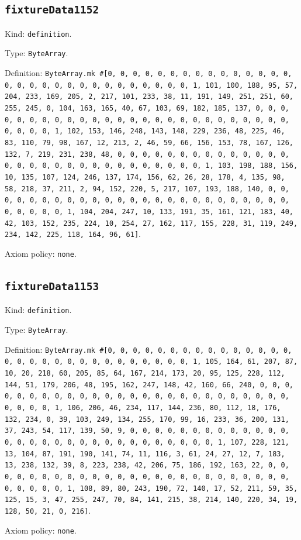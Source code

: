 \documentclass[11pt]{article}
\begin{document}
\subsection*{\texttt{fixtureData1152}}
\noindent Kind: \texttt{definition}.\par
\noindent Type: \texttt{ByteArray}.\par
\noindent Definition: \texttt{ByteArray.mk \#[0, 0, 0, 0, 0, 0, 0, 0, 0, 0, 0, 0, 0, 0, 0, 0, 0, 0, 0, 0, 0, 0, 0, 0, 0, 0, 0, 0, 0, 0, 1, 101, 100, 188, 95, 57, 204, 233, 169, 205, 2, 217, 101, 233, 38, 11, 191, 149, 251, 251, 60, 255, 245, 0, 104, 163, 165, 40, 67, 103, 69, 182, 185, 137, 0, 0, 0, 0, 0, 0, 0, 0, 0, 0, 0, 0, 0, 0, 0, 0, 0, 0, 0, 0, 0, 0, 0, 0, 0, 0, 0, 0, 0, 0, 1, 102, 153, 146, 248, 143, 148, 229, 236, 48, 225, 46, 83, 110, 79, 98, 167, 12, 213, 2, 46, 59, 66, 156, 153, 78, 167, 126, 132, 7, 219, 231, 238, 48, 0, 0, 0, 0, 0, 0, 0, 0, 0, 0, 0, 0, 0, 0, 0, 0, 0, 0, 0, 0, 0, 0, 0, 0, 0, 0, 0, 0, 0, 0, 1, 103, 198, 188, 156, 10, 135, 107, 124, 246, 137, 174, 156, 62, 26, 28, 178, 4, 135, 98, 58, 218, 37, 211, 2, 94, 152, 220, 5, 217, 107, 193, 188, 140, 0, 0, 0, 0, 0, 0, 0, 0, 0, 0, 0, 0, 0, 0, 0, 0, 0, 0, 0, 0, 0, 0, 0, 0, 0, 0, 0, 0, 0, 0, 1, 104, 204, 247, 10, 133, 191, 35, 161, 121, 183, 40, 42, 103, 152, 235, 224, 10, 254, 27, 162, 117, 155, 228, 31, 119, 249, 234, 142, 225, 118, 164, 96, 61]}.\par
\noindent Axiom policy: \texttt{none}.\par
\subsection*{\texttt{fixtureData1153}}
\noindent Kind: \texttt{definition}.\par
\noindent Type: \texttt{ByteArray}.\par
\noindent Definition: \texttt{ByteArray.mk \#[0, 0, 0, 0, 0, 0, 0, 0, 0, 0, 0, 0, 0, 0, 0, 0, 0, 0, 0, 0, 0, 0, 0, 0, 0, 0, 0, 0, 0, 0, 1, 105, 164, 61, 207, 87, 10, 20, 218, 60, 205, 85, 64, 167, 214, 173, 20, 95, 125, 228, 112, 144, 51, 179, 206, 48, 195, 162, 247, 148, 42, 160, 66, 240, 0, 0, 0, 0, 0, 0, 0, 0, 0, 0, 0, 0, 0, 0, 0, 0, 0, 0, 0, 0, 0, 0, 0, 0, 0, 0, 0, 0, 0, 0, 1, 106, 206, 46, 234, 117, 144, 236, 80, 112, 18, 176, 132, 234, 0, 39, 103, 249, 134, 255, 170, 99, 16, 233, 36, 200, 131, 37, 243, 54, 117, 139, 50, 9, 0, 0, 0, 0, 0, 0, 0, 0, 0, 0, 0, 0, 0, 0, 0, 0, 0, 0, 0, 0, 0, 0, 0, 0, 0, 0, 0, 0, 0, 0, 1, 107, 228, 121, 13, 104, 87, 191, 190, 141, 74, 11, 116, 3, 61, 24, 27, 12, 7, 183, 13, 238, 132, 39, 8, 223, 238, 42, 206, 75, 186, 192, 163, 22, 0, 0, 0, 0, 0, 0, 0, 0, 0, 0, 0, 0, 0, 0, 0, 0, 0, 0, 0, 0, 0, 0, 0, 0, 0, 0, 0, 0, 0, 0, 1, 108, 89, 80, 243, 190, 72, 140, 17, 52, 211, 59, 35, 125, 15, 3, 47, 255, 247, 70, 84, 141, 215, 38, 214, 140, 220, 34, 19, 128, 50, 21, 0, 216]}.\par
\noindent Axiom policy: \texttt{none}.\par
\end{document}
